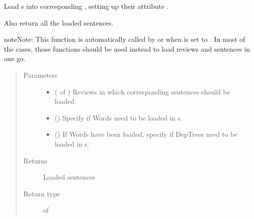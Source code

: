 \documentclass[letterpaper,10pt,english]{sphinxmanual}
\begin{document}

\begin{fulllineitems}
\label{\detokenize{index:loacore.load.sentence_load.load_sentences_in_reviews}}
Load  s into corresponding , setting up their attribute .

Also return all the loaded sentences.

\begin{sphinxadmonition}{note}{Note:}
This function is automatically called by  or 
when  is set to .
In most of the cases, those functions should be used instead to load reviews and sentences in one go.
\end{sphinxadmonition}
\begin{quote}\begin{description}
\item[{Parameters}] \leavevmode\begin{itemize}
\item {} 
 ( of ) \textendash{} Reviews in which corresponding sentences should be loaded.

\item {} 
 () \textendash{} Specify if Words need to be loaded in  s.

\item {} 
 () \textendash{} If Words have been loaded, specify if DepTrees need to be loaded in  s.

\end{itemize}

\item[{Returns}] \leavevmode
Loaded sentences

\item[{Return type}] \leavevmode
{} of 

\end{description}\end{quote}

\end{fulllineitems}
\end{document}
